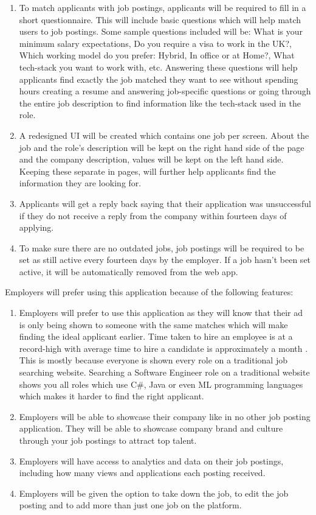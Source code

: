 \begin{enumerate}
    \item To match applicants with job postings, applicants will be required to fill in a short questionnaire. This will include basic questions which will help match users to job postings. Some sample questions included will be: What is your minimum salary expectations, Do you require a visa to work in the UK?, Which working model do you prefer: Hybrid, In office or at Home?, What tech-stack you want to work with, etc. Answering these questions will help applicants find exactly the job matched they want to see without spending hours creating a resume and answering job-specific questions or going through the entire job description to find information like the tech-stack used in the role.
    \item A redesigned UI will be created which contains one job per screen. About the job and the role's description will be kept on the right hand side of the page and the company description, values will be kept on the left hand side. Keeping these separate in pages, will further help applicants find the information they are looking for.
    \item Applicants will get a reply back saying that their application was unsuccessful if they do not receive a reply from the company within fourteen days of applying.
    \item To make sure there are no outdated jobs, job postings will be required to be set as still active every fourteen days by the employer. If a job hasn't been set active, it will be automatically removed from the web app.
\end{enumerate}

Employers will prefer using this application because of the following features:

\begin{enumerate}
    \item Employers will prefer to use this application as they will know that their ad is only being shown to someone with the same matches which will make finding the ideal applicant earlier. Time taken to hire an employee is at a record-high with average time to hire a candidate is approximately a month \parencite{Reference37}. This is mostly because everyone is shown every role on a traditional job searching website. Searching a Software Engineer role on a traditional website shows you all roles which use C\#, Java or even ML programming languages which makes it harder to find the right applicant. 
    \item Employers will be able to showcase their company like in no other job posting application. They will be able to showcase company brand and culture through your job postings to attract top talent.
    \item Employers will have access to analytics and data on their job postings, including how many views and applications each posting received.
    \item Employers will be given the option to take down the job, to edit the job posting and to add more than just one job on the platform.
\end{enumerate}

